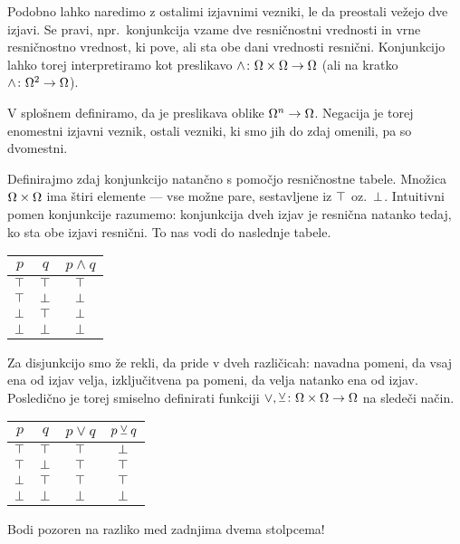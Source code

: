                 Podobno lahko naredimo z ostalimi izjavnimi vezniki, le da preostali vežejo dve izjavi. Se pravi, npr.~konjunkcija vzame dve resničnostni vrednosti in vrne resničnostno vrednost, ki pove, ali sta obe dani vrednosti resnični. Konjunkcijo lahko torej interpretiramo kot preslikavo $\land\colon \Omega \times \Omega \to \Omega$ (ali na kratko $\land\colon \Omega^2 \to \Omega$).

                V splošnem definiramo, da je  preslikava oblike $\Omega^n \to \Omega$. Negacija je torej enomestni izjavni veznik, ostali vezniki, ki smo jih do zdaj omenili, pa so dvomestni.

                Definirajmo zdaj konjunkcijo natančno s pomočjo resničnostne tabele. Množica $\Omega \times \Omega$ ima štiri elemente --- vse možne pare, sestavljene iz $\top$ oz.~$\bot$. Intuitivni pomen konjunkcije razumemo: konjunkcija dveh izjav je resnična natanko tedaj, ko sta obe izjavi resnični. To nas vodi do naslednje tabele.
                \begin{center}
                        \begin{tabular}{cc|c}
                                $p$ & $q$ & $p \land q$ \\
                                \hline
                                $\top$ & $\top$ & $\top$ \\
                                $\top$ & $\bot$ & $\bot$ \\
                                $\bot$ & $\top$ & $\bot$ \\
                                $\bot$ & $\bot$ & $\bot$
                        \end{tabular}
                \end{center}

                Za disjunkcijo smo že rekli, da pride v dveh različicah: navadna pomeni, da vsaj ena od izjav velja, izključitvena pa pomeni, da velja natanko ena od izjav. Posledično je torej smiselno definirati funkciji $\lor, \mathbin{\veebar}\colon \Omega \times \Omega \to \Omega$ na sledeči način.
                \begin{center}
                        \begin{tabular}{cc|cc}
                                $p$ & $q$ & $p \lor q$ & $p \mathbin{\veebar} q$ \\
                                \hline
                                $\top$ & $\top$ & $\top$ & $\bot$ \\
                                $\top$ & $\bot$ & $\top$ & $\top$ \\
                                $\bot$ & $\top$ & $\top$ & $\top$ \\
                                $\bot$ & $\bot$ & $\bot$ & $\bot$
                        \end{tabular}
                \end{center}
                Bodi pozoren na razliko med zadnjima dvema stolpcema!

